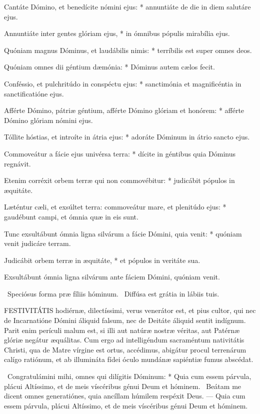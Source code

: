 Cantáte Dómino, et benedícite nómini ejus: * annuntiáte de die in diem salutáre ejus.

Annuntiáte inter gentes glóriam ejus, * in ómnibus pópulis mirabília ejus.

Quóniam magnus Dóminus, et laudábilis nimis: * terríbilis est super omnes deos.

Quóniam omnes dii géntium dæmónia: * Dóminus autem cælos fecit.

Conféssio, et pulchritúdo in conspéctu ejus: * sanctimónia et magnificéntia in sanctificatióne ejus.

Afférte Dómino, pátriæ géntium, afférte Dómino glóriam et honórem: * afférte Dómino glóriam nómini ejus.

Tóllite hóstias, et introíte in átria ejus: * adoráte Dóminum in átrio sancto ejus.

Commoveátur a fácie ejus univérsa terra: * dícite in géntibus quia Dóminus regnávit.

Etenim corréxit orbem terræ qui non commovébitur: * judicábit pópulos in æquitáte.

Læténtur cæli, et exsúltet terra: commoveátur mare, et plenitúdo ejus: * gaudébunt campi, et ómnia quæ in eis sunt.

Tunc exsultábunt ómnia ligna silvárum a fácie Dómini, quia venit: * quóniam venit judicáre terram.

Judicábit orbem terræ in æquitáte, * et pópulos in veritáte sua.

 Exsultábunt ómnia ligna silvárum ante fáciem Dómini, quóniam venit.

\V\ Speciósus forma præ fíliis hóminum. \R\ Diffúsa est grátia in lábiis tuis.




\lettrine[lines=2]{F}{ESTIVITÁTIS} hodiérnæ, dilectíssimi, verus venerátor est, et pius cultor, qui nec de Incarnatióne Dómini áliquid falsum, nec de Deitáte áliquid sentit indígnum. Parit enim perículi malum est, si illi aut natúræ nostræ véritas, aut Patérnæ glóriæ negátur æquálitas. Cum ergo ad intelligéndum sacraméntum nativitátis Christi, qua de Matre vírgine est ortus, accédimus, abigátur procul terrenárum calígo ratiónum, et ab illumináta fídei óculo mundánæ sapiéntiæ fumus abscédat.

\R\ Congratulámini mihi, omnes qui dilígitis Dóminum: * Quia cum essem párvula, plácui Altíssimo, et de meis víscéribus génui Deum et hóminem. \V\ Beátam me dicent omnes generatiónes, quia ancíllam húmilem respéxit Deus. --- Quia cum essem párvula, plácui Altíssimo, et de meis víscéribus génui Deum et hóminem.

